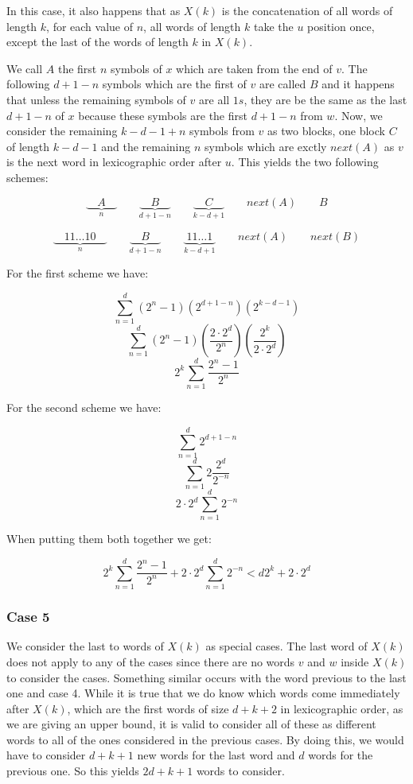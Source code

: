 \documentclass[11pt,a4paper,twoside]{tesis}
\theoremstyle{definition}
\begin{document}
In this case, it also happens that as $X(k)$ is the concatenation of all words of length $k$, for each value of $n$, 
all words of length $k$ take the $u$ position once, except the last of the words of length $k$ in $X(k)$.

We call $A$ the first $n$ symbols of $x$ which are taken from the end of $v$. The following $d + 1 - n$ symbols which are the first of $v$ are called $B$ and it happens that unless the remaining symbols of $v$ are all $1s$, 
they are be the same as the last $d + 1 - n$ of $x$ because these symbols are the first $d + 1 - n$ from $w$.
Now, we consider the remaining $k - d - 1 + n$ symbols from $v$ as two blocks, one block $C$ of length $k - d - 1$ and the remaining $n$ symbols which are exctly $next(A)$ as $v$ is the next word in lexicographic order after $u$.
This yields the two following schemes:

$$\underbrace{\quad A \quad }_{n} \qquad \underbrace{\quad B \quad }_{d + 1 - n}  \qquad \underbrace{\quad C \quad }_{k-d+1} \qquad next(A) \qquad B$$

$$\underbrace{\quad 11\dots10 \quad }_{n} \qquad \underbrace{\quad B \quad }_{d + 1 - n}  \qquad \underbrace{\; 11\dots1 \; }_{k-d+1} \qquad next(A) \qquad next(B)$$

For the first scheme we have:

$$\sum_{n=1}^{d}(2^n - 1) (2^{d + 1 - n}) (2^{k - d - 1})$$
$$\sum_{n=1}^{d}(2^n - 1) (\frac{2 \cdot 2^d}{2^n})     (\frac{2^k}{2 \cdot 2^d})$$
$$ 2^k \sum_{n=1}^{d} \frac{2^n - 1}{2^n} $$


For the second scheme we have:

$$ \sum_{n=1}^{d} 2^{d + 1 - n}$$
$$ \sum_{n=1}^{d} 2 \frac{2^d}{2^{- n}}$$
$$ 2 \cdot 2^d \sum_{n=1}^{d} 2^{- n}$$

When putting them both together we get:

$$  2^k \sum_{n=1}^{d} \frac{2^n - 1}{2^n}  + 2 \cdot 2^d \sum_{n=1}^{d} 2^{- n} < d2^k + 2 \cdot 2^d$$

\subsubsection{Case 5}

We consider the last to words of $X(k)$ as special cases. The last word of $X(k)$ does not apply to any of the cases since there are no words $v$ and $w$ inside $X(k)$ to consider the cases. Something similar occurs with the word previous to the last one and case 4. 
While it is true that we do know which words come immediately after  $X(k)$, which are the first words of size $d+k+2$ in lexicographic order, as we are giving an upper bound, it is valid to consider all of these as different words to all of the ones considered in the previous cases.
By doing this, we would have to consider $d+k+1$ new words for the last word and $d$ words for the previous one. So this yields $2d+k+1$ words to consider.
\end{document}
